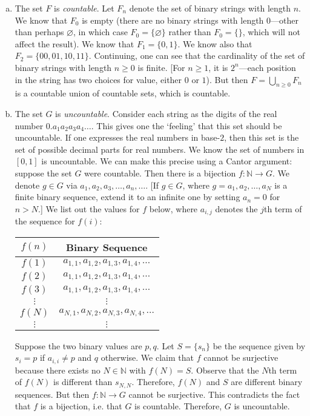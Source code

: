 \documentclass[11pt,letterpaper]{article}
\begin{document}
\begin{enumerate}[(a)]
\item The set $F$ is \textit{countable}. Let $F_n$ denote the set of binary strings with length $n$. We know that $F_0$ is empty (there are no binary strings with length $0$---other than perhaps $\varnothing$, in which case $F_0= \{ \varnothing \}$ rather than $F_0= \{ \}$, which will not affect the result). We know that $F_1= \{ 0, 1 \}$. We know also that $F_2= \{ 00, 01, 10, 11 \}$. Continuing, one can see that the cardinality of the set of binary strings with length $n \geq 0$ is finite. [For $n \geq 1$, it is $2^n$---each position in the string has two choices for value, either $0$ or $1$). But then $F= \bigcup_{n \geq 0} F_n$ is a countable union of countable sets, which is countable. 

\item The set $G$ is \textit{uncountable}. Consider each string as the digits of the real number $0.a_1a_2a_3a_4\ldots$. This gives one the `feeling' that this set should be uncountable. If one expresses the real numbers in base-$2$, then this set is the set of possible decimal parts for real numbers. We know the set of numbers in $[0, 1]$ is uncountable. We can make this precise using a Cantor argument: suppose the set $G$ were countable. Then there is a bijection $f: \mathbb{N} \to G$. We denote $g \in G$ via $a_1, a_2, a_3, \ldots, a_n, \ldots$. [If $g \in G$, where $g= a_1, a_2, \ldots, a_N$ is a finite binary sequence, extend it to an infinite one by setting $a_n= 0$ for $n > N$.] We list out the values for $f$ below, where $a_{i,j}$ denotes the $j$th term of the sequence for $f(i)$: \par
	\begin{table}[ht]
	\centering
	\begin{tabular}{cc}
	$f(n)$ & Binary Sequence \\ \hline
	$f(1)$ & $a_{1,1}, a_{1,2}, a_{1,3}, a_{1,4}, \ldots$ \\
	$f(2)$ & $a_{1,1}, a_{1,2}, a_{1,3}, a_{1,4}, \ldots$ \\
	$f(3)$ & $a_{1,1}, a_{1,2}, a_{1,3}, a_{1,4}, \ldots$ \\
	$\vdots$ & $\vdots$ \\
	$f(N)$ & $a_{N,1}, a_{N,2}, a_{N,3}, a_{N,4}, \ldots$ \\
	$\vdots$ & $\vdots$
	\end{tabular}
	\end{table} \par
Suppose the two binary values are $p, q$. Let $S= \{ s_n \}$ be the sequence given by $s_i= p$ if $a_{i,i} \neq p$ and $q$ otherwise. We claim that $f$ cannot be surjective because there exists no $N \in \mathbb{N}$ with $f(N)= S$. Observe that the $N$th term of $f(N)$ is different than $s_{N,N}$. Therefore, $f(N)$ and $S$ are different binary sequences. But then $f: \mathbb{N} \to G$ cannot be surjective. This contradicts the fact that $f$ is a bijection, i.e. that $G$ is countable. Therefore, $G$ is uncountable. 


\end{enumerate}
\end{document}
